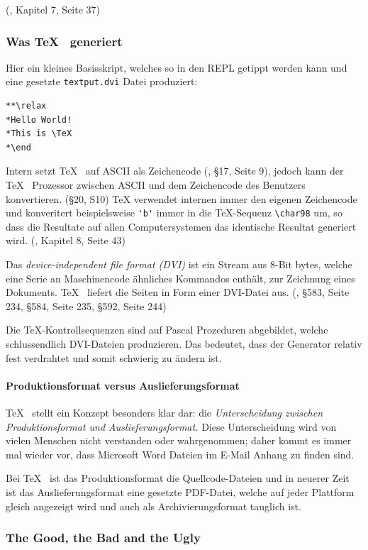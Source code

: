 (\cite{tex-a}, Kapitel 7, Seite 37)

\subsubsection{Was \TeX~ generiert}

Hier ein kleines Basisskript, welches so in den REPL getippt werden kann und
eine gesetzte \lstinline|textput.dvi| Datei produziert:

\begin{verbatim}
**\relax
*Hello World!
*This is \TeX
*\end
\end{verbatim}

Intern setzt \TeX~ auf ASCII als Zeichencode (\cite{tex-a}, §17, Seite 9),
jedoch kann der
\TeX~ Prozessor zwischen ASCII und dem Zeichencode des Benutzers konvertieren.
(§20, S10)
TeX verwendet internen immer den eigenen Zeichencode und konveritert beispielsweise
\lstinline|'b'| immer in die \TeX-Sequenz \lstinline|\char98| um,
so dass die Resultate auf allen
Computersystemen das identische Resultat generiert wird.
(\cite{tex-a}, Kapitel 8, Seite 43)

Das \emph{device-independent file format (DVI)} ist ein Stream aus
8-Bit bytes, welche eine Serie an
Maschinencode ähnliches Kommandos enthält, zur Zeichnung eines Dokuments.
\TeX~ liefert die Seiten in Form einer DVI-Datei aus.
(\cite{tex-b}, §583, Seite 234, §584, Seite 235, §592, Seite 244)

Die \TeX-Kontrollsequenzen sind auf Pascal Prozeduren abgebildet,
welche schlussendlich DVI-Dateien produzieren. Das bedeutet, dass der Generator
relativ fest verdrahtet und somit schwierig zu ändern ist.

\paragraph{Produktionsformat versus Auslieferungsformat}

\TeX~ stellt ein Konzept besonders klar dar: die \emph{Unterscheidung
zwischen Produktionsformat und Auslieferungsformat.} Diese Unterscheidung
wird von vielen Menschen nicht verstanden oder wahrgenommen; daher kommt
es immer mal wieder vor, dass Microsoft Word Dateien im E-Mail Anhang zu
finden sind.

Bei \TeX~ ist das Produktionsformat die Quellcode-Dateien und in neuerer
Zeit ist das Auslieferungsformat eine gesetzte PDF-Datei, welche auf jeder
Plattform gleich angezeigt wird und auch als Archivierungsformat tauglich
ist.


\subsubsection{The Good, the Bad and the Ugly}

